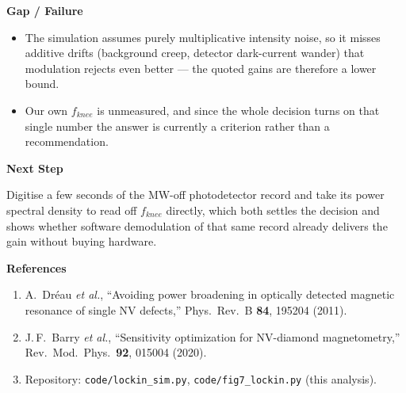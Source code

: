 \documentclass[11pt,a4paper]{ltjsarticle}
\newcommand{\sectionblock}[1]{%
  \vspace{2mm}
  {\large\textbf{#1}}
  \vspace{1mm}

}
\begin{document}
\sectionblock{Gap / Failure}

\begin{itemize}[leftmargin=8mm]
  \item The simulation assumes purely multiplicative intensity noise, so it misses additive drifts (background creep, detector dark-current wander) that modulation rejects even better --- the quoted gains are therefore a lower bound.
  \item Our own $f_{knee}$ is unmeasured, and since the whole decision turns on that single number the answer is currently a criterion rather than a recommendation.
\end{itemize}

\sectionblock{Next Step}

Digitise a few seconds of the MW-off photodetector record and take its power spectral density to read off $f_{knee}$ directly, which both settles the decision and shows whether software demodulation of that same record already delivers the gain without buying hardware.

\sectionblock{References}

\begin{enumerate}[leftmargin=8mm]
  \item A.\ Dr\'eau \emph{et al.}, ``Avoiding power broadening in optically detected magnetic resonance of single NV defects,'' Phys.\ Rev.\ B \textbf{84}, 195204 (2011).
  \item J.\,F.\ Barry \emph{et al.}, ``Sensitivity optimization for NV-diamond magnetometry,'' Rev.\ Mod.\ Phys.\ \textbf{92}, 015004 (2020).
  \item Repository: \texttt{code/lockin\_sim.py}, \texttt{code/fig7\_lockin.py} (this analysis).
\end{enumerate}
\end{document}
